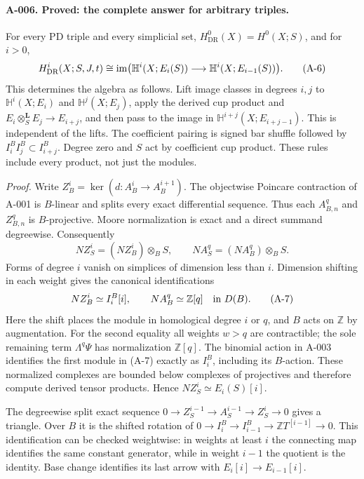 \paragraph{A-006. Proved: the complete answer for arbitrary triples.}
For every PD triple and every simplicial set, $H^0_{\mathrm{DR}}(X)=
H^0(X;S)$, and for $i>0$,
\[
 H^i_{\mathrm{DR}}(X;S,J,t)\cong
 \operatorname{im}\bigl(\mathbb H^i(X;E_i(S))\longrightarrow
              \mathbb H^i(X;E_{i-1}(S))\bigr).
 \tag{A-6}\label{eq:alltriples}
\]
This determines the algebra as follows. Lift image classes in degrees
$i,j$ to $\mathbb H^i(X;E_i)$ and $\mathbb H^j(X;E_j)$, apply
the derived cup product and
$E_i\otimes_S^{\mathbf L}E_j\to E_{i+j}$, and then pass to
the image in $\mathbb H^{i+j}(X;E_{i+j-1})$. This is independent of
the lifts. The coefficient pairing is signed bar shuffle followed by
$I_i^BI_j^B\subset I_{i+j}^B$. Degree zero and $S$ act by coefficient
cup product. These rules include every product, not just the modules.

\emph{Proof.}
Write $Z_B^i=\ker(d:A_B^i\to A_B^{i+1})$. The objectwise
Poincare contraction of A-001 is $B$-linear and splits every exact
differential sequence. Thus each $A_{B,n}^q$ and $Z_{B,n}^q$ is
$B$-projective. Moore normalization is exact and a direct summand
degreewise. Consequently
\[
 NZ_S^i=(NZ_B^i)\otimes_B S,\qquad
 NA_S^q=(NA_B^q)\otimes_B S.
\]
Forms of degree $i$ vanish on simplices of dimension less than $i$.
Dimension shifting in each weight gives the canonical identifications
\[
 NZ_B^i\simeq I_i^B[i],\qquad NA_B^q\simeq\mathbb Z[q]
 \quad\hbox{in }D(B).
 \tag{A-7}
\]
Here the shift places the module in homological degree $i$ or $q$,
and $B$ acts on $\mathbb Z$ by augmentation. For the second equality
all weights $w>q$ are contractible; the sole remaining term
$\Lambda^q\Psi$ has normalization $\mathbb Z[q]$. The binomial
action in A-003 identifies the first module in (A-7) exactly as
$I_i^B$, including its $B$-action. These normalized complexes are
bounded below complexes of projectives and therefore compute derived
tensor products. Hence $NZ_S^i\simeq E_i(S)[i]$.

The degreewise split exact sequence
$0\to Z_S^{i-1}\to A_S^{i-1}\to Z_S^i\to0$ gives a triangle.
Over $B$ it is the shifted rotation of
$0\to I_i^B\to I_{i-1}^B\to\mathbb Z T^{[i-1]}\to0$.
This identification can be checked weightwise: in weights at least
$i$ the connecting map identifies the same constant generator,
while in weight $i-1$ the quotient is the identity. Base change
identifies its last arrow with $E_i[i]\to E_{i-1}[i]$.

